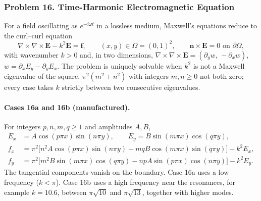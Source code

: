 \documentclass[11pt]{article}
\begin{document}
\subsubsection*{Problem 16. Time-Harmonic Electromagnetic Equation}

For a field oscillating as $e^{-i\omega t}$ in a lossless medium, Maxwell's
equations reduce to the curl--curl equation \cite{Mon03}
\[
\boxed{\nabla\times\nabla\times\mathbf{E}-k^2\mathbf{E}=\mathbf{f}},
\qquad (x,y)\in\Omega=(0,1)^2,
\qquad \mathbf{n}\times\mathbf{E}=0 \text{ on } \partial\Omega,
\]
with wavenumber $k>0$ and, in two dimensions,
$\nabla\times\nabla\times\mathbf{E}=(\partial_yw,\,-\partial_xw)$,
$w=\partial_xE_y-\partial_yE_x$. The problem is uniquely solvable when
$k^2$ is not a Maxwell eigenvalue of the square, $\pi^2(m^2+n^2)$ with
integers $m,n\ge0$ not both zero; every case takes $k$ strictly between two
consecutive eigenvalues.

\paragraph{Cases 16a and 16b (manufactured).}
For integers $p,n,m,q\ge1$ and amplitudes $A,B$,
\[
\begin{aligned}
E_x&=A\cos(p\pi x)\sin(n\pi y),\qquad
E_y=B\sin(m\pi x)\cos(q\pi y),\\
f_x&=\pi^2\bigl[n^2A\cos(p\pi x)\sin(n\pi y)-mqB\cos(m\pi x)\sin(q\pi y)\bigr]-k^2E_x,\\
f_y&=\pi^2\bigl[m^2B\sin(m\pi x)\cos(q\pi y)-npA\sin(p\pi x)\cos(n\pi y)\bigr]-k^2E_y.
\end{aligned}
\]
The tangential components vanish on the boundary. Case 16a uses a low
frequency ($k<\pi$). Case 16b uses a high frequency near the resonances,
for example $k=10.6$, between $\pi\sqrt{10}$ and $\pi\sqrt{13}$, together
with higher modes.
\end{document}
